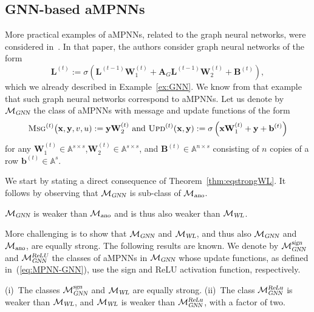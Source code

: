 \subsection{GNN-based aMPNNs}
More practical examples of aMPNNs, related to the graph neural networks, were considered in~\cite{grohewl}.
In that paper, the authors consider graph neural networks of the form
$$
\mathbf{L}^{(t)}:=\sigma\left(\mathbf{L}^{(t-1)}\mathbf{W}_1^{(t)}+\mathbf{A}_G\mathbf{L}^{(t-1)}\mathbf{W}_2^{(t)}+\mathbf{B}^{(t)}\right), $$
which we already described in Example~\ref{ex:GNN}. We know from that example that such graph neural networks correspond to aMPNNs.
Let us denote by $\mathcal{M}_{\textsl{GNN}}$ the class of aMPNNs with message and update functions of the form
\begin{equation}\textsc{Msg}^{(t)}\bigl(\mathbf{x},\mathbf{y},v,u):=\mathbf{y}\mathbf{W}_2^{(t)}
\text{ and } 
\textsc{Upd}^{(t)}(\mathbf{x},\mathbf{y}):=\sigma\left(\mathbf{x}\mathbf{W}_1^{(t)}+\mathbf{y} + \mathbf{b}^{(t)}\right) \label{eq:MPNN-GNN}
\end{equation}
for any $\mathbf{W}_1^{(t)}\in\mathbb{A}^{s\times s}$,$\mathbf{W}_2^{(t)}\in\mathbb{A}^{s\times s}$, and $\mathbf{B}^{(t)}\in\mathbb{A}^{n\times s}$ consisting of $n$ copies of a row $\mathbf{b}^{(t)}\in\mathbb{A}^{s}$. 

We start by stating a direct consequence of Theorem~\ref{thm:eqstrongWL}. It follows by observing
that $\mathcal{M}_{\textsl{GNN}}$ is sub-class of 
$\mathcal{M}_{\textsl{ano}}$.
\begin{corollary}
$\mathcal{M}_{\textsl{GNN}}$ is weaker than $\mathcal{M}_{\textsl{ano}}$ and is thus also weaker than $\mathcal{M}_{\textsl{WL}}$.
\end{corollary}

More challenging is to show that $\mathcal{M}_{\textsl{GNN}}$ and $\mathcal{M}_{\textsl{WL}}$, and thus also $\mathcal{M}_{\textsl{GNN}}$ and $\mathcal{M}_{\textsl{ano}}$, are equally strong. The following results are known. We denote
by $\mathcal{M}_{\textsl{GNN}}^{\textsl{sign}}$
and $\mathcal{M}_{\textsl{GNN}}^{\textsl{ReLU}}$ the classes of  aMPNNs in $\mathcal{M}_{\textsl{GNN}}$ whose update functions, as defined in~(\ref{eq:MPNN-GNN}), use the sign and ReLU activation function, respectively.

\begin{theorem} \label{thm:grohe_lower}
(i)~The classes $\mathcal{M}_{\textsl{GNN}}^{\textsl{sgn}}$ and  $\mathcal{M}_{\textsl{WL}}$ are equally strong. (ii)~The class 
$\mathcal{M}_{\textsl{GNN}}^{\textsl{ReLu}}$ is weaker than $\mathcal{M}_{\textsl{WL}}$, and
$\mathcal{M}_{\textsl{WL}}$ is weaker than $\mathcal{M}_{\textsl{GNN}}^{\textsl{ReLu}}$, with a factor of two.
\end{theorem}

